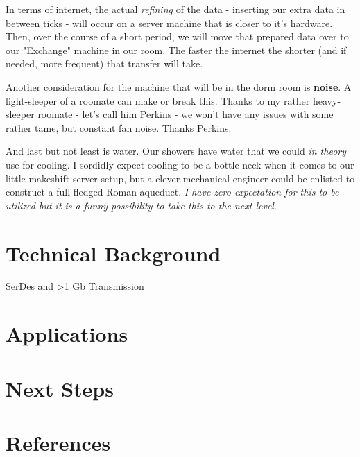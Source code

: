 \documentclass[12pt]{article}
\begin{document}
In terms of internet, the actual \emph{refining} of the data - inserting our extra data in between ticks - will occur
on a server machine that is closer to it's hardware. Then, over the course of a short period, we will move that prepared
data over to our "Exchange" machine in our room. The faster the internet the shorter (and if needed, more frequent) that transfer will take.

Another consideration for the machine that will be in the dorm room is \textbf{noise}. A light-sleeper of a roomate can 
make or break this. Thanks to my rather heavy-sleeper roomate - let's call him Perkins - we won't have any issues with 
some rather tame, but constant fan noise. Thanks Perkins.

And last but not least is water. Our showers have water that we could \emph{in theory} use for cooling.
I sordidly expect cooling to be a bottle neck when it comes to our little makeshift server setup, but a
clever mechanical engineer could be enlisted to construct a full fledged Roman aqueduct. \emph{I have 
zero expectation for this to be utilized but it is a funny possibility to take this to the next level}.


\clearpage


\section*{Technical Background}

SerDes and >1 Gb Transmission


\clearpage


\section*{Applications}

\clearpage


\section*{Next Steps}

\clearpage


\section*{References}

\clearpage
\end{document}
